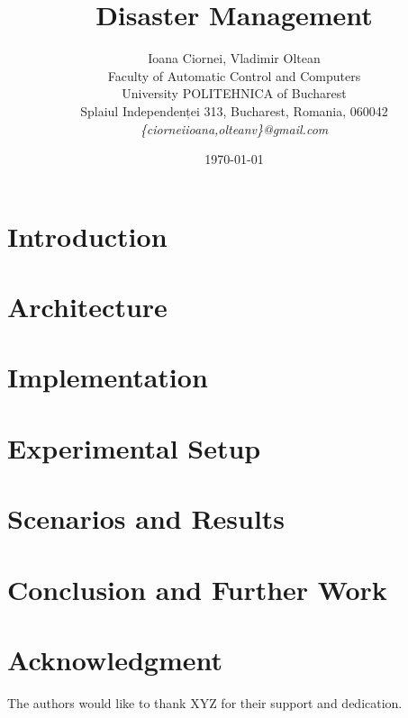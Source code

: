 \documentclass[12pt]{article}
\title{Disaster Management}
\author{Ioana Ciornei, Vladimir Oltean\\
Faculty of Automatic Control and Computers\\
University POLITEHNICA of Bucharest\\
Splaiul Independenței 313, Bucharest, Romania, 060042 \\
\emph{\{ciorneiioana,olteanv\}@gmail.com}}
\date{\today}
\begin{document}
\maketitle

\begin{abstract}

\end{abstract}

\section{Introduction}
\label{sec:introduction}


\section{Architecture}
\label{sec:architecture}


\section{Implementation}
\label{sec:implementation}


\section{Experimental Setup}
\label{sec:setup}


\section{Scenarios and Results}
\label{sec:results}


\section{Conclusion and Further Work}
\label{sec:conclusion}


\section*{Acknowledgment}
\label{sec:acknowledgment}

The authors would like to thank XYZ for their support and dedication.



\end{document}
